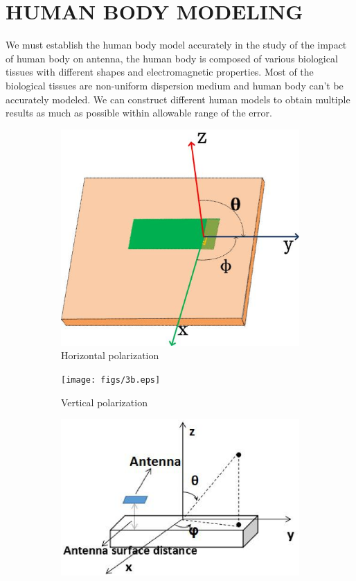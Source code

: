 \documentclass[journal]{IEEEtran}
\begin{document}
\section{HUMAN BODY MODELING}
We must establish the human body model accurately in the study of the impact of human body on antenna, the human body is
composed of various biological tissues with different shapes and electromagnetic properties. Most of the biological tissues
are non-uniform dispersion medium and human body can’t be accurately modeled. We can construct different human models
to obtain multiple results as much as possible within allowable range of the error.
\begin{figure}[!htb]
\centering
\begin{subfigure}[b]{0.24\textwidth}
\includegraphics[width=\textwidth]{figs/3a.eps}
\caption{Horizontal polarization}
\label{fig:3a}	
\end{subfigure}		
\begin{subfigure}[b]{0.24\textwidth}
\texttt{[image: figs/3b.eps]}
\caption{Vertical polarization}
\label{fig:3b}
\end{subfigure}
\begin{subfigure}[b]{0.4\textwidth}
\includegraphics[width=\textwidth]{figs/3c.eps}

\end{subfigure}
\end{figure}
\end{document}
